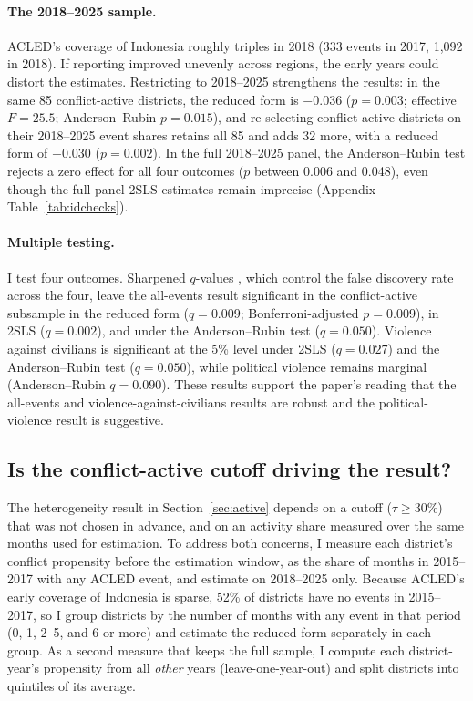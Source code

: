 \documentclass[12pt]{article}
\begin{document}
\paragraph{The 2018--2025 sample.} ACLED's coverage of Indonesia roughly triples in 2018 (333 events in 2017, 1,092 in 2018). If reporting improved unevenly across regions, the early years could distort the estimates. Restricting to 2018--2025 strengthens the results: in the same 85 conflict-active districts, the reduced form is $-0.036$ ($p=0.003$; effective $F = 25.5$; Anderson--Rubin $p=0.015$), and re-selecting conflict-active districts on their 2018--2025 event shares retains all 85 and adds 32 more, with a reduced form of $-0.030$ ($p=0.002$). In the full 2018--2025 panel, the Anderson--Rubin test rejects a zero effect for all four outcomes ($p$ between 0.006 and 0.048), even though the full-panel 2SLS estimates remain imprecise (Appendix Table~\ref{tab:idchecks}).

\paragraph{Multiple testing.} I test four outcomes. Sharpened $q$-values \citep{benjamini2006adaptive,anderson2008multiple}, which control the false discovery rate across the four, leave the all-events result significant in the conflict-active subsample in the reduced form ($q=0.009$; Bonferroni-adjusted $p=0.009$), in 2SLS ($q=0.002$), and under the Anderson--Rubin test ($q=0.050$). Violence against civilians is significant at the 5\% level under 2SLS ($q=0.027$) and the Anderson--Rubin test ($q=0.050$), while political violence remains marginal (Anderson--Rubin $q=0.090$). These results support the paper's reading that the all-events and violence-against-civilians results are robust and the political-violence result is suggestive.

\subsection{Is the conflict-active cutoff driving the result?}
\label{sec:propensity}

The heterogeneity result in Section~\ref{sec:active} depends on a cutoff ($\tau \geq 30\%$) that was not chosen in advance, and on an activity share measured over the same months used for estimation. To address both concerns, I measure each district's conflict propensity before the estimation window, as the share of months in 2015--2017 with any ACLED event, and estimate on 2018--2025 only. Because ACLED's early coverage of Indonesia is sparse, 52\% of districts have no events in 2015--2017, so I group districts by the number of months with any event in that period (0, 1, 2--5, and 6 or more) and estimate the reduced form separately in each group. As a second measure that keeps the full sample, I compute each district-year's propensity from all \emph{other} years (leave-one-year-out) and split districts into quintiles of its average.
\end{document}
